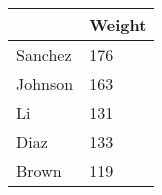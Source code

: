 \begin{tabular}{ll}
& Weight \\ 
\hline 
Sanchez & 176 \\ 
Johnson & 163 \\ 
Li & 131 \\ 
Diaz & 133 \\ 
Brown & 119 \\ 
\hline 
\end{tabular}